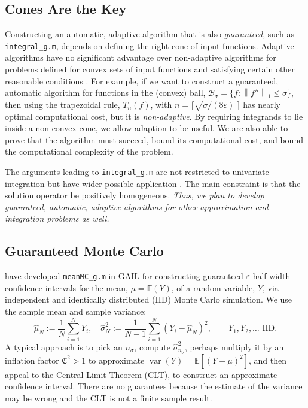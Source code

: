 \documentclass[11pt]{NSFamsart}
\newcommand{\bbE}{\mathbb{E}}
\DeclareMathOperator*{\var}{var}
\newcommand{\cb}{\mathcal{B}}
\newcommand{\fC}{\mathfrak{C}}
\newcommand{\norm}[2][{}]{\ensuremath{\left \lVert #2 \right \rVert}_{#1}}
\newcommand{\hmu}{\hat{\mu}}
\newcommand{\hsigma}{\hat{\sigma}}
\begin{document}
\subsection{Cones Are the Key}
Constructing an automatic, adaptive algorithm that is also \emph{guaranteed}, such as {\tt integral\_g.m}, depends on defining the right cone of input functions.  Adaptive algorithms have no significant advantage over non-adaptive algorithms for problems defined for convex sets of input functions and satisfying certain other reasonable conditions \cite[Chapter 4, Theorem 5.2.1]{TraWasWoz88}. For example, if we want to construct a guaranteed, automatic algorithm for functions in the (convex) ball, $\cb_{\sigma} = \{f : \norm[1]{f''} \le \sigma \}$, then using the trapezoidal rule, $T_n(f)$, with $n=\bigl\lceil\sqrt{\sigma/(8 \varepsilon)}\, \bigr \rceil$ has nearly optimal computational cost, but it is \emph{non-adaptive}.  By requiring integrands to lie inside a non-convex cone, we allow adaption to be useful. We are also able to prove that the algorithm must succeed, bound its computational cost, and bound the computational complexity of the problem.

The arguments leading to {\tt integral\_g.m} are not restricted to univariate integration but have wider possible application \citep{HicEtal14b}.  The main constraint is that the solution operator be positively homogeneous.  \emph{Thus, we plan to develop guaranteed, automatic, adaptive algorithms for other approximation and integration problems as well.}

\subsection{Guaranteed Monte Carlo} \label{MC_g_sec}
\cite{HicEtal14a} have developed {\tt meanMC\_g.m} in GAIL for constructing guaranteed $\varepsilon$-half-width confidence intervals for the mean, $\mu=\bbE(Y)$, of a random variable, $Y$, via independent and identically distributed (IID) Monte Carlo simulation.  We use the sample mean and sample variance:
\begin{equation} \label{samplemean}
\hmu_{N}:=\frac 1{N} \sum_{i=1}^{N} Y_i, \quad \hsigma_{N}^2:=\frac 1{N-1} \sum_{i=1}^N (Y_i-\hmu_{N})^2, \qquad Y_1, Y_2, \ldots \text{ IID}.
\end{equation}
A typical approach is to pick an $n_{\sigma}$, compute $\hsigma_{n_{\sigma}}^2$, perhaps multiply it by an inflation factor $\fC^2>1$ to approximate $\var(Y)=\bbE[(Y-\mu)^2]$, and then appeal to the  Central Limit Theorem (CLT), to construct an approximate confidence interval.  There are no guarantees because the estimate of the variance may be wrong and the CLT is not a finite sample result.
\end{document}

